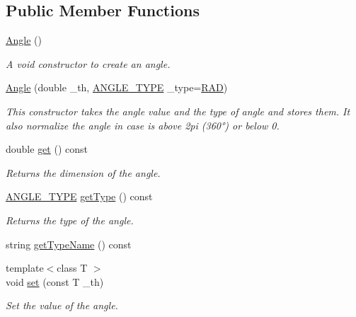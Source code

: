 \subsection*{Public Member Functions}
\begin{DoxyCompactItemize}
\item 
\mbox{\hyperlink{class_angle_aca3c6e1519b40835d31736430ca082a9}{Angle}} ()
\begin{DoxyCompactList}\small\item\em A void constructor to create an angle. \end{DoxyCompactList}\item 
\mbox{\hyperlink{class_angle_a0db849c45f88e8d68c5eb95f467007ed}{Angle}} (double \+\_\+th, \mbox{\hyperlink{class_angle_a4f7b9849ce8780bcba95ca3ee45cff77}{A\+N\+G\+L\+E\+\_\+\+T\+Y\+PE}} \+\_\+type=\mbox{\hyperlink{class_angle_a4f7b9849ce8780bcba95ca3ee45cff77a93ab6b68075fd7a6fe724fbde5b13c1f}{R\+AD}})
\begin{DoxyCompactList}\small\item\em This constructor takes the angle value and the type of angle and stores them. It also normalize the angle in case is above 2pi (360°) or below 0. \end{DoxyCompactList}\item 
double \mbox{\hyperlink{class_angle_a8ec5cc925d4ab3a3232746f254bd33a4}{get}} () const
\begin{DoxyCompactList}\small\item\em Returns the dimension of the angle. \end{DoxyCompactList}\item 
\mbox{\hyperlink{class_angle_a4f7b9849ce8780bcba95ca3ee45cff77}{A\+N\+G\+L\+E\+\_\+\+T\+Y\+PE}} \mbox{\hyperlink{class_angle_a827079369e1344c8761723be0665bb2e}{get\+Type}} () const
\begin{DoxyCompactList}\small\item\em Returns the type of the angle. \end{DoxyCompactList}\item 
string \mbox{\hyperlink{class_angle_a3253eb4e061fa49be862120370fb836b}{get\+Type\+Name}} () const
\item 
{\footnotesize template$<$class T $>$ }\\void \mbox{\hyperlink{class_angle_a41d5a0188663cb0178b0e9e0628ea00c}{set}} (const T \+\_\+th)
\begin{DoxyCompactList}\small\item\em Set the value of the angle. \end{DoxyCompactList}\item 

\end{DoxyCompactItemize}
